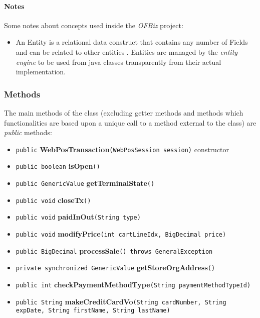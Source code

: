 \paragraph{Notes} Some notes about concepts used inside the \emph{OFBiz} project:
\begin{itemize}
 	\item An Entity is a relational data construct that contains any number of Fields and can be related to other entities \cite{OFBiz}. Entities are managed by the \emph{entity engine} to be used from java classes transparently from their actual implementation.
\end{itemize}

\subsubsection{Methods}

The main methods of the class (excluding getter methods and methods which functionalities are based upon a unique call to a method external to the class) are \emph{public} methods:

\begin{itemize}
	\item \texttt{public} \textbf{WebPosTransaction}\texttt{(WebPosSession session)} constructor \\
	\item \texttt{public boolean} \textbf{isOpen}\texttt{()} \\
	\item \texttt{public GenericValue} \textbf{getTerminalState}\texttt{()} \\
	\item \texttt{public void} \textbf{closeTx}\texttt{()} \\
   \item \texttt{public void} \textbf{paidInOut}\texttt{(String type)} \\
   \item \texttt{public void} \textbf{modifyPrice}\texttt{(int cartLineIdx, BigDecimal price)} \\
   \item \label{method:processSale} \texttt{public BigDecimal} \textbf{processSale}\texttt{() throws GeneralException} \\
   \item \texttt{private synchronized GenericValue} \textbf{getStoreOrgAddress}\texttt{()} \\
   \item \texttt{public int} \textbf{checkPaymentMethodType}\texttt{(String paymentMethodTypeId)} \\
   \item \texttt{public String} \textbf{makeCreditCardVo}\texttt{(String cardNumber, String expDate, String firstName, String lastName)} \\
\end{itemize}